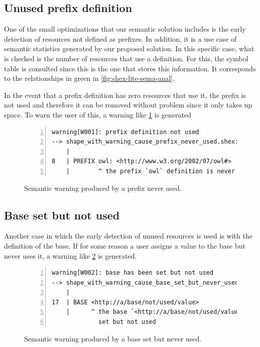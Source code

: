 \subsection{Unused prefix definition}
One of the small optimizations that our semantic solution includes is the early detection of resources
not defined as prefixes. In addition, it is a use case of semantic statistics generated by our proposed
solution. In this specific case, what is checked is the number of resources that use a definition. For this,
the symbol table is consulted since this is the one that stores this information. It corresponds to the
relationships in green in \cref{fig:shex-lite-sema-anal}.

In the event that a prefix definition has zero resources that use it, the prefix is not used and therefore
it can be removed without problem since it only takes up space. To warn the user of this, a warning like \cref{fig:warn-pref-not-used}
is generated

\begin{figure}
    \begin{lstlisting}[numbers=left,basicstyle=\ttfamily\scriptsize]
warning[W001]: prefix definition not used
--> shape_with_warning_cause_prefix_never_used.shex:8:12
    |
8   | PREFIX owl: <http://www.w3.org/2002/07/owl#>
    |        ^ the prefix `owl` definition is never used
    \end{lstlisting}
    \caption[Semantic warning produced by a prefix never used]{Semantic warning produced by a prefix never used.}
    \label{fig:warn-pref-not-used}
\end{figure}

\subsection{Base set but not used}
Another case in which the early detection of unused resources is used is with the definition of the base.
If for some reason a user assigns a value to the base but never uses it, a warning like \cref{fig:warn-base-not-used}
is generated.

\begin{figure}
\begin{lstlisting}[numbers=left,basicstyle=\ttfamily\scriptsize]
warning[W002]: base has been set but not used
--> shape_with_warning_cause_base_set_but_never_used.shex:17:5
    |
17  | BASE <http://a/base/not/used/value>
    |      ^ the base `<http://a/base/not/used/value>` definition is
             set but not used
    \end{lstlisting}
    \caption[Semantic warning produced by a base set but never used]{Semantic warning produced by a base set but never used.}
    \label{fig:warn-base-not-used}
\end{figure}
